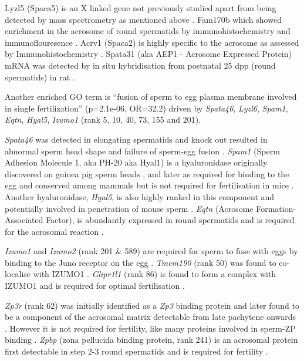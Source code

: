 Lyzl5 (Spaca5) is an X linked gene not previously studied apart from being detected by mass spectrometry as mentioned above \parencite{Guyonnet2012Isolation}. Fam170b which showed enrichment in the acrosome of round spermatids by immunohistochemistry and immunoflouresence \parencite{Li2015FAM170B}. Acrv1 (Spaca2) is highly specific to the acrosome as assessed by Immunohistochemistry \parencite{Osuru2014acrosomal}. Spata31 (aka AEP1 - Acrosome Expressed Protein) mRNA was detected by in situ hybridisation from postnatal 25 dpp (round spermatids) in rat \parencite{Luk2006Acrosomespecific}.
 
Another enriched GO term is ``fusion of sperm to egg plasma membrane involved in single fertilization'' (p=2.1e-06, OR=32.2) driven by \textit{Spata46}, \textit{Lyzl6}, \textit{Spam1}, \textit{Eqtn}, \textit{Hyal5}, \textit{Izumo1} (rank 5, 10, 40, 73, 155 and 201).

\textit{Spata46} was detected in elongating spermatids and knock out resulted in abnormal sperm head shape and failure of sperm-egg fusion \parencite{Chen2016Deficiency}. \textit{Spam1} (Sperm Adhesion Molecule 1, aka PH-20 aka Hyal1) is a hyaluronidase originally discovered on guinea pig sperm heads \parencite{Myles1981Surface}, and later as required for binding to the egg \parencite{Primakoff1985role} and conserved among mammals \parencite{Lathrop1990cDNA} but is not required for fertilisation in mice \parencite{Baba2002Mouse}. Another hyaluronidase, \textit{Hyal5}, is also highly ranked in this component and potentially involved in penetration of mouse sperm \parencite{Kim2005Identification, Kimura2009Functional}. \textit{Eqtn} (Acrosome Formation-Associated Factor), is abundantly expressed in round spermatids and is required for the acrosomal reaction \parencite{Li2006Afaf, Hao2014Equatorin}.

\textit{Izumo1} and \textit{Izumo2} (rank 201 \& 589) are required for sperm to fuse with eggs by binding to the Juno receptor on the egg \parencite{Inoue2005immunoglobulin, Bianchi2014Juno}. \textit{Tmem190} (rank 50) was found to co-localise with IZUMO1 \parencite{Nishimura2011Characterization}. \textit{Glipr1l1} (rank 86) is found to form a complex with IZUMO1 and is required for optimal fertilisation \parencite{Gibbs2010Glioma,Gaikwad2019GLIPR1L1}.

\textit{Zp3r} (rank 62) was initially identified as a \textit{Zp3} binding protein \parencite{Bleil1990Identification} and later found to be a component of the acrosomal matrix detectable from late pachytene onwards \parencite{Kim2001Mouse}. However it is not required for fertility, like many proteins involved in sperm-ZP binding \parencite{Muro2012Function}. \textit{Zpbp} (zona pellucida binding protein, rank 241) is an acrosomal protein first detectable in step 2-3 round spermatids and is required for fertility \parencite{Lin2007Loss}.

